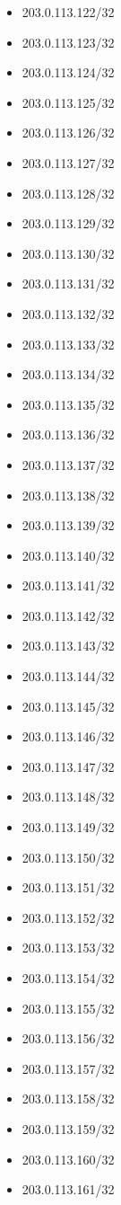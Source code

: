 \documentclass[a4paper,10pt]{article}
\begin{document}
\begin{itemize}
  \item 203.0.113.122/32
  \item 203.0.113.123/32
  \item 203.0.113.124/32
  \item 203.0.113.125/32
  \item 203.0.113.126/32
  \item 203.0.113.127/32
  \item 203.0.113.128/32
  \item 203.0.113.129/32
  \item 203.0.113.130/32
  \item 203.0.113.131/32
  \item 203.0.113.132/32
  \item 203.0.113.133/32
  \item 203.0.113.134/32
  \item 203.0.113.135/32
  \item 203.0.113.136/32
  \item 203.0.113.137/32
  \item 203.0.113.138/32
  \item 203.0.113.139/32
  \item 203.0.113.140/32
  \item 203.0.113.141/32
  \item 203.0.113.142/32
  \item 203.0.113.143/32
  \item 203.0.113.144/32
  \item 203.0.113.145/32
  \item 203.0.113.146/32
  \item 203.0.113.147/32
  \item 203.0.113.148/32
  \item 203.0.113.149/32
  \item 203.0.113.150/32
  \item 203.0.113.151/32
  \item 203.0.113.152/32
  \item 203.0.113.153/32
  \item 203.0.113.154/32
  \item 203.0.113.155/32
  \item 203.0.113.156/32
  \item 203.0.113.157/32
  \item 203.0.113.158/32
  \item 203.0.113.159/32
  \item 203.0.113.160/32
  \item 203.0.113.161/32

\end{itemize}
\end{document}
